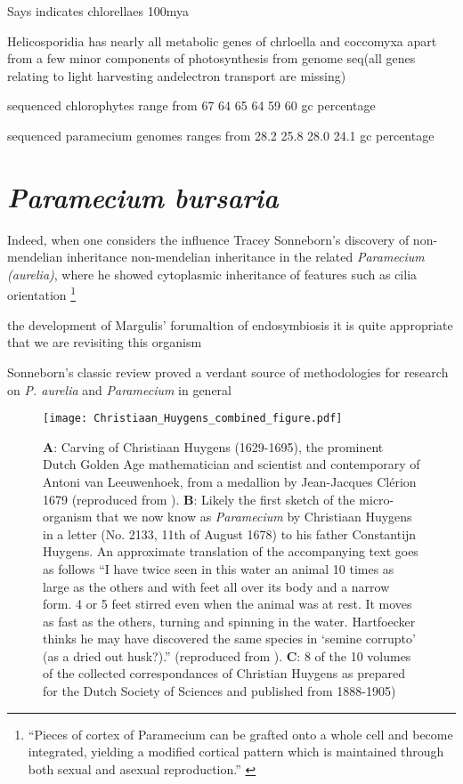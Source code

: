 Says \citep{DeWever2009} indicates chlorellaes 100mya \citep{Pombert2014}

Helicosporidia has nearly all metabolic genes of chrloella and coccomyxa apart from
a few minor components of photosynthesis \citep{Pombert2014} from genome seq(all genes relating to light harvesting andelectron transport are missing)




sequenced chlorophytes range from  67 64 65 64 59 60 gc percentage \citep{Blanc2010a}

sequenced paramecium genomes ranges from 28.2 25.8 28.0 24.1 gc percentage \citep{McGrath2014}

\section{\textit{Paramecium bursaria}}

\citep{Corliss1974} 





Indeed, when one considers the influence Tracey Sonneborn's discovery of non-mendelian
inheritance non-mendelian inheritance in the related \textit{Paramecium (aurelia)}, where he showed
cytoplasmic inheritance of features such as cilia orientation \footnote{``Pieces of cortex of Paramecium can be grafted onto a whole cell and
    become integrated, yielding a modified cortical pattern which is maintained through both sexual and asexual reproduction.'' \citep{Beisson1965}}

the development of Margulis' forumaltion of endosymbiosis \citep{Margulis1998} it is
quite appropriate that we are revisiting this organism

Sonneborn's classic review \citep{Sonneborn1950} proved a verdant source of methodologies
for research on  \textit{P. aurelia} and \textit{Paramecium} in general

\begin{figure}[h!]
    \caption{\textbf{A}: Carving of Christiaan Huygens (1629-1695), the prominent Dutch Golden Age mathematician and scientist and contemporary of Antoni van Leeuwenhoek, from a medallion by Jean-Jacques Cl\'erion 1679 (reproduced from \citep{Huygens}). \textbf{B}: Likely the first sketch of the micro-organism that we now know as \textit{Paramecium} by Christiaan Huygens in a letter (No. 2133, 11th of August 1678) to his father Constantijn Huygens. An approximate translation of the accompanying text goes as follows ``I have twice seen in this water an animal 10 times as large as the others and with feet all over its body and a narrow form. 4 or 5 feet stirred even when the animal was at rest. It moves as fast as the others, turning and spinning in the water. Hartfoecker thinks he may have discovered the same species in `semine corrupto' (as a dried out husk?).'' (reproduced from \citep{Huygens}). \textbf{C}: 8 of the 10 volumes of the collected correspondances of Christian Huygens as prepared for the Dutch Society of Sciences and published from 1888-1905)}
\texttt{[image: Christiaan\_Huygens\_combined\_figure.pdf]}
\end{figure}



